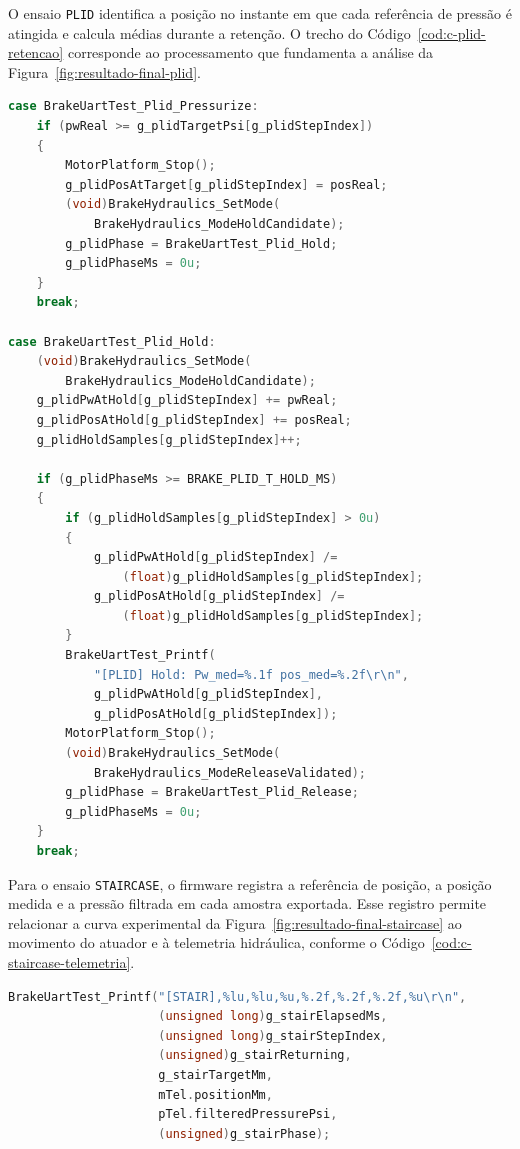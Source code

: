 O ensaio \texttt{PLID} identifica a posição no instante em que cada referência de pressão é atingida e calcula médias durante a retenção. O trecho do Código~\ref{cod:c-plid-retencao} corresponde ao processamento que fundamenta a análise da Figura~\ref{fig:resultado-final-plid}.

\begin{lstlisting}[language=C,caption={Deteccao de referencia e calculo das medias de retencao no ensaio PLID.},label={cod:c-plid-retencao}]
case BrakeUartTest_Plid_Pressurize:
    if (pwReal >= g_plidTargetPsi[g_plidStepIndex])
    {
        MotorPlatform_Stop();
        g_plidPosAtTarget[g_plidStepIndex] = posReal;
        (void)BrakeHydraulics_SetMode(
            BrakeHydraulics_ModeHoldCandidate);
        g_plidPhase = BrakeUartTest_Plid_Hold;
        g_plidPhaseMs = 0u;
    }
    break;

case BrakeUartTest_Plid_Hold:
    (void)BrakeHydraulics_SetMode(
        BrakeHydraulics_ModeHoldCandidate);
    g_plidPwAtHold[g_plidStepIndex] += pwReal;
    g_plidPosAtHold[g_plidStepIndex] += posReal;
    g_plidHoldSamples[g_plidStepIndex]++;

    if (g_plidPhaseMs >= BRAKE_PLID_T_HOLD_MS)
    {
        if (g_plidHoldSamples[g_plidStepIndex] > 0u)
        {
            g_plidPwAtHold[g_plidStepIndex] /=
                (float)g_plidHoldSamples[g_plidStepIndex];
            g_plidPosAtHold[g_plidStepIndex] /=
                (float)g_plidHoldSamples[g_plidStepIndex];
        }
        BrakeUartTest_Printf(
            "[PLID] Hold: Pw_med=%.1f pos_med=%.2f\r\n",
            g_plidPwAtHold[g_plidStepIndex],
            g_plidPosAtHold[g_plidStepIndex]);
        MotorPlatform_Stop();
        (void)BrakeHydraulics_SetMode(
            BrakeHydraulics_ModeReleaseValidated);
        g_plidPhase = BrakeUartTest_Plid_Release;
        g_plidPhaseMs = 0u;
    }
    break;
\end{lstlisting}

Para o ensaio \texttt{STAIRCASE}, o firmware registra a referência de posição, a posição medida e a pressão filtrada em cada amostra exportada. Esse registro permite relacionar a curva experimental da Figura~\ref{fig:resultado-final-staircase} ao movimento do atuador e à telemetria hidráulica, conforme o Código~\ref{cod:c-staircase-telemetria}.

\begin{lstlisting}[language=C,caption={Registro de posicao e pressao no ensaio STAIRCASE.},label={cod:c-staircase-telemetria}]
BrakeUartTest_Printf("[STAIR],%lu,%lu,%u,%.2f,%.2f,%.2f,%u\r\n",
                     (unsigned long)g_stairElapsedMs,
                     (unsigned long)g_stairStepIndex,
                     (unsigned)g_stairReturning,
                     g_stairTargetMm,
                     mTel.positionMm,
                     pTel.filteredPressurePsi,
                     (unsigned)g_stairPhase);
\end{lstlisting}

